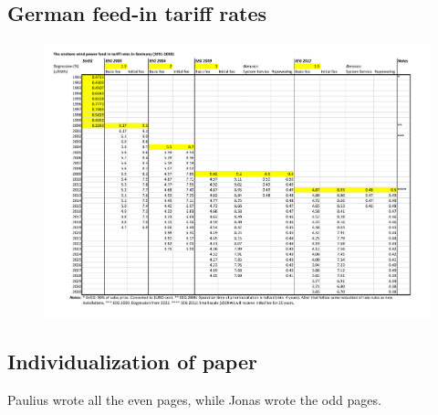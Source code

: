 \documentclass[a4paper, 12pt]{article}
\begin{document}
\subsection{German feed-in tariff rates}

\begin{figure}[H]
	\includegraphics[width=1\textwidth]{Feed-in-tariffs-rates}
\end{figure}




\subsection{Individualization of paper}
Paulius wrote all the even pages, while Jonas wrote the odd pages.
\end{document}
